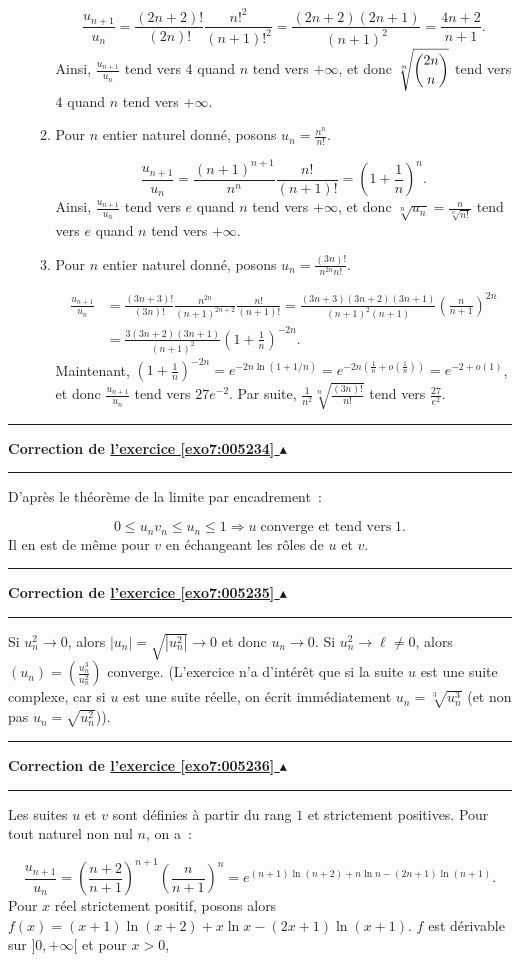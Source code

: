\documentclass[11pt,a4paper]{article}
\newcounter{exo}
\newcommand{\correction}[1]{\hypertarget{cor7:#1}{}\label{cor7:#1}{\bf Correction de \hyperlink{exo7:#1}{l'exercice \ref{exo7:#1} $\blacktriangle$}}\vspace{1mm}\hrule\vspace{1mm}}
\newcommand{\fincorrection}{\vspace{1mm}\hrule\vspace*{7mm}}
\begin{document}
\begin{enumerate}
\begin{enumerate}
$$\frac{u_{n+1}}{u_n}=\frac{(2n+2)!}{(2n)!}\frac{n!^2}{(n+1)!^2}=\frac{(2n+2)(2n+1)}{(n+1)^2}=\frac{4n+2}{n+1}.$$
Ainsi, $\frac{u_{n+1}}{u_n}$ tend vers $4$ quand $n$ tend vers $+\infty$, et donc $\sqrt[n]{\dbinom{2n}{n}}$ tend vers $4$ quand $n$ tend vers $+\infty$.
  \item Pour $n$ entier naturel donné, posons $u_n=\frac{n^n}{n!}$.
 
$$\frac{u_{n+1}}{u_n}=\frac{(n+1)^{n+1}}{n^n}\frac{n!}{(n+1)!}=\left(1+\frac{1}{n}\right)^n.$$
Ainsi, $\frac{u_{n+1}}{u_n}$ tend vers $e$ quand $n$ tend vers $+\infty$, et donc $\sqrt[n]{u_n}=\frac{n}{\sqrt[n]{n!}}$ tend vers $e$ quand $n$ tend vers $+\infty$.
  \item Pour $n$ entier naturel donné, posons $u_n=\frac{(3n)!}{n^{2n}n!}$.

\begin{align*}
\frac{u_{n+1}}{u_n}&=\frac{(3n+3)!}{(3n)!}\frac{n^{2n}}{(n+1)^{2n+2}}\frac{n!}{(n+1)!}
=\frac{(3n+3)(3n+2)(3n+1)}{(n+1)^2(n+1)}\left(\frac{n}{n+1}\right)^{2n}\\
 &=
\frac{3(3n+2)(3n+1)}{(n+1)^2}\left(1+\frac{1}{n}\right)^{-2n}.
\end{align*}
Maintenant, $\left(1+\frac{1}{n}\right)^{-2n}=e^{-2n\ln(1+1/n)}=e^{-2n(\frac{1}{n}+o(\frac{1}{n}))}=e^{-2+o(1)}$, et donc $\frac{u_{n+1}}{u_n}$ tend vers $27e^{-2}$. Par suite, $\frac{1}{n^2}\sqrt[n]{\frac{(3n)!}{n!}}$ tend vers $\frac{27}{e^2}$.
  \end{enumerate}
\end{enumerate}
\fincorrection
\correction{005234}
D'après le théorème de la limite par encadrement~:

$$0\leq u_nv_n\leq u_n\leq1\Rightarrow u\;\mbox{converge et tend vers}\;1.$$
Il en est de même pour $v$ en échangeant les rôles de $u$ et $v$.
\fincorrection
\correction{005235}
Si $u_n^2\rightarrow0$, alors $|u_n|=\sqrt{|u_n^2|}\rightarrow0$ et donc $u_n\rightarrow0$.
Si $u_n^2\rightarrow\ell\neq0$, alors $(u_n)=(\frac{u_n^3}{u_n^2})$ converge.
(L'exercice n'a d'intérêt que si la suite $u$ est une suite complexe, car si $u$ est une suite réelle, on écrit immédiatement $u_n=\sqrt[3]{u_n^3}$ 
(et non pas $u_n=\sqrt{u_n^2}$)).
\fincorrection
\correction{005236}
Les suites $u$ et $v$ sont définies à partir du rang $1$ et strictement positives.
Pour tout naturel non nul $n$, on a~:

$$\frac{u_{n+1}}{u_n}=\left(\frac{n+2}{n+1}\right)^{n+1}\left(\frac{n}{n+1}\right)^n=e^{(n+1)\ln(n+2)+n\ln n-(2n+1)\ln(n+1)}.$$
Pour $x$ réel strictement positif, posons alors $f(x)=(x+1)\ln(x+2)+x\ln x-(2x+1)\ln(x+1)$.
$f$ est dérivable sur $]0,+\infty[$ et pour $x>0$,
\end{document}
